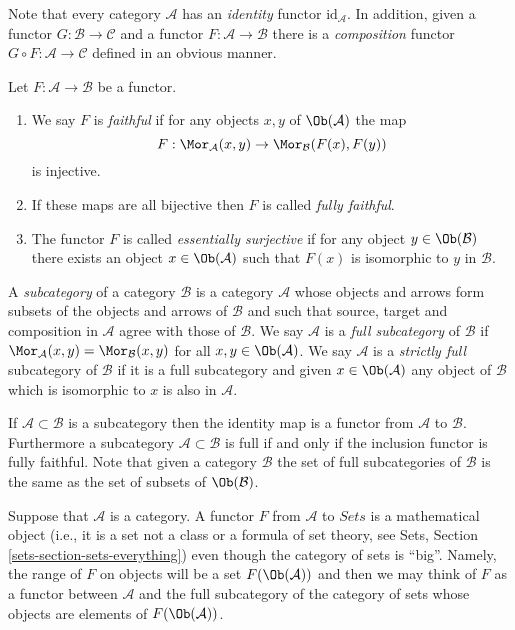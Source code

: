 \noindent
Note that every category $\mathcal{A}$ has an
{\it identity} functor $\text{id}_\mathcal{A}$.
In addition, given a functor $G : \mathcal{B} \to \mathcal{C}$
and a functor $F : \mathcal{A} \to \mathcal{B}$ there is
a {\it composition} functor $G \circ F : \mathcal{A} \to \mathcal{C}$
defined in an obvious manner.

\begin{definition}
\label{definition-faithful}
Let $F : \mathcal{A} \to \mathcal{B}$ be a functor.
\begin{enumerate}
\item We say $F$ is {\it faithful} if
for any objects $x, y$ of $\Ob(\mathcal{A})$ the map
$$
F : \Mor_\mathcal{A}(x, y) \to \Mor_\mathcal{B}(F(x), F(y))
$$
is injective.
\item If these maps are all bijective then $F$ is called
{\it fully faithful}.
\item
The functor $F$ is called {\it essentially surjective} if for any
object $y \in \Ob(\mathcal{B})$ there exists an object
$x \in \Ob(\mathcal{A})$ such that $F(x)$ is isomorphic to $y$ in
$\mathcal{B}$.
\end{enumerate}
\end{definition}

\begin{definition}
\label{definition-subcategory}
A {\it subcategory} of a category $\mathcal{B}$ is
a category $\mathcal{A}$ whose objects and arrows
form subsets of the objects and arrows
of $\mathcal{B}$ and such that source, target
and composition in $\mathcal{A}$ agree with those
of $\mathcal{B}$. We say $\mathcal{A}$ is a
{\it full subcategory} of $\mathcal{B}$ if $\Mor_\mathcal{A}(x, y)
= \Mor_\mathcal{B}(x, y)$ for all $x, y \in \Ob(\mathcal{A})$.
We say $\mathcal{A}$ is a {\it strictly full} subcategory of $\mathcal{B}$
if it is a full subcategory and given $x \in \Ob(\mathcal{A})$ any
object of $\mathcal{B}$ which is isomorphic to $x$ is also in $\mathcal{A}$.
\end{definition}

\noindent
If $\mathcal{A} \subset \mathcal{B}$ is a subcategory then the
identity map is a functor from $\mathcal{A}$ to $\mathcal{B}$.
Furthermore a subcategory $\mathcal{A} \subset \mathcal{B}$
is full if and only if the inclusion functor is fully faithful.
Note that given a category $\mathcal{B}$ the set of full subcategories
of $\mathcal{B}$ is the same as the set of subsets of
$\Ob(\mathcal{B})$.

\begin{remark}
\label{remark-functor-into-sets}
Suppose that $\mathcal{A}$ is a category.
A functor $F$ from $\mathcal{A}$ to $\textit{Sets}$
is a mathematical object (i.e., it is a set not a class or a formula
of set theory, see
Sets, Section \ref{sets-section-sets-everything})
even though the category of sets is ``big''.
Namely, the range of $F$ on objects will be
a set $F(\Ob(\mathcal{A}))$ and then we
may think of $F$ as a functor between
$\mathcal{A}$ and the full subcategory
of the category of sets whose
objects are elements of $F(\Ob(\mathcal{A}))$.
\end{remark}

